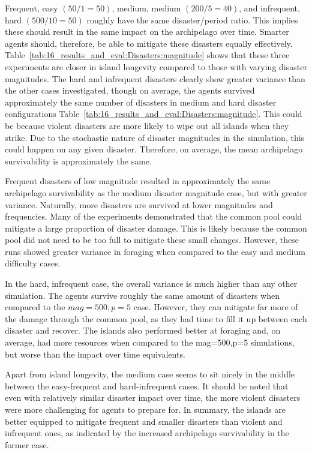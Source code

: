 Frequent, easy $(50/1=50)$, medium, medium $(200/5=40)$, and infrequent, hard $(500/10 = 50)$ roughly have the same disaster/period ratio. This implies these should result in the same impact on the archipelago over time. Smarter agents should, therefore, be able to mitigate these disasters equally effectively. Table~\ref{tab:16_results_and_eval:Disasters:magnitude} shows that these three experiments are closer in island longevity compared to those with varying disaster magnitudes. The hard and infrequent disasters clearly show greater variance than the other cases investigated, though on average, the agents survived approximately the same number of disasters in medium and hard disaster configurations Table~\ref{tab:16_results_and_eval:Disasters:magnitude}. This could be because violent disasters are more likely to wipe out all islands when they strike. Due to the stochastic nature of disaster magnitudes in the simulation, this could happen on any given disaster. Therefore, on average, the mean archipelago survivability is approximately the same.

Frequent disasters of low magnitude resulted in approximately the same archipelago survivability as the medium disaster magnitude case, but with greater variance. Naturally, more disasters are survived at lower magnitudes and frequencies. Many of the experiments demonstrated that the common pool could mitigate a large proportion of disaster damage. This is likely because the common pool did not need to be too full to mitigate these small changes. However, these runs showed greater variance in foraging when compared to the easy and medium difficulty cases.

In the hard, infrequent case, the overall variance is much higher than any other simulation. The agents survive roughly the same amount of disasters when compared to the $mag=500,p=5$ case. However, they can mitigate far more of the damage through the common pool, as they had time to fill it up between each disaster and recover. The islands also performed better at foraging and, on average, had more resources when compared to the mag=500,p=5 simulations, but worse than the impact over time equivalents. 

Apart from island longevity, the medium case seems to sit nicely in the middle between the easy-frequent and hard-infrequent cases. It should be noted that even with relatively similar disaster impact over time, the more violent disasters were more challenging for agents to prepare for. In summary, the islands are better equipped to mitigate frequent and smaller disasters than violent and infrequent ones, as indicated by the increased archipelago survivability in the former case.

